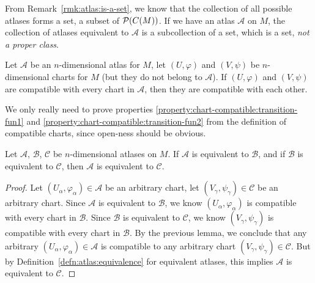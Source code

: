 \begin{remark}
From Remark~\ref{rmk:atlas:is-a-set}, we know that the collection of all
possible atlases forms a set, a subset of $\mathcal{P}(C(M))$.
If we have an atlas $\mathcal{A}$ on $M$, the collection of atlases
equivalent to $\mathcal{A}$ is a subcollection of a set, which is a set,
\emph{not a proper class}.
\end{remark}

\begin{lemma}
Let $\mathcal{A}$ be an $n$-dimensional atlas for $M$, let $(U,\varphi)$ and $(V,\psi)$ 
be $n$-dimensional charts for $M$ (but they do not belong to $\mathcal{A}$).
If $(U,\varphi)$ and $(V,\psi)$ are compatible with every chart in $\mathcal{A}$,
then they are compatible with each other.
\end{lemma}

We only really need to prove properties
\ref{property:chart-compatible:transition-fun1} and
\ref{property:chart-compatible:transition-fun2} from the definition of
compatible charts, since open-ness should be obvious.

\begin{corollary}
Let $\mathcal{A}$, $\mathcal{B}$, $\mathcal{C}$ be $n$-dimensional
atlases on $M$. If $\mathcal{A}$ is equivalent to $\mathcal{B}$, and if
$\mathcal{B}$ is equivalent to $\mathcal{C}$, then $\mathcal{A}$ is
equivalent to $\mathcal{C}$.
\end{corollary}

\begin{proof}
Let $(U_{\alpha},\varphi_{\alpha})\in\mathcal{A}$ be an arbitrary chart,
let $(V_{\gamma},\psi_{\gamma})\in\mathcal{C}$ be an arbitrary chart. 
Since $\mathcal{A}$ is equivalent to $\mathcal{B}$, we know
$(U_{\alpha},\varphi_{\alpha})$ is compatible with every chart in $\mathcal{B}$.
Since $\mathcal{B}$ is equivalent to $\mathcal{C}$, we know
$(V_{\gamma},\psi_{\gamma})$ is compatible with every chart in $\mathcal{B}$.
By the previous lemma, we conclude that any arbitrary
$(U_{\alpha},\varphi_{\alpha})\in\mathcal{A}$ is compatible to any arbitrary
chart $(V_{\gamma},\psi_{\gamma})\in\mathcal{C}$. But by Definition~\ref{defn:atlas:equivalence} for
equivalent atlases, this implies $\mathcal{A}$ is equivalent to $\mathcal{C}$.
\end{proof}


